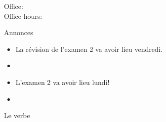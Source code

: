 \documentclass{beamer}
\subtitle[\lexi{Mettre} et adjectifs démonstratifs]{Le verbe \lexi{mettre} et les adjectifs démonstratifs}
\begin{document}
  \begin{frame}
    \titlepage
    \tiny{Office: \\
          Office hours: }
  \end{frame}

  \begin{frame}{Annonces}
    \begin{itemize}
      \item La révision de l'examen 2 va avoir lieu vendredi.
      \item[] 
      \item L'examen 2 va avoir lieu lundi!
      \item[] 
    \end{itemize}
  \end{frame}

  \begin{frame}{Le verbe}
    \begin{center}
      
    \end{center}
  \end{frame}
\end{document}
